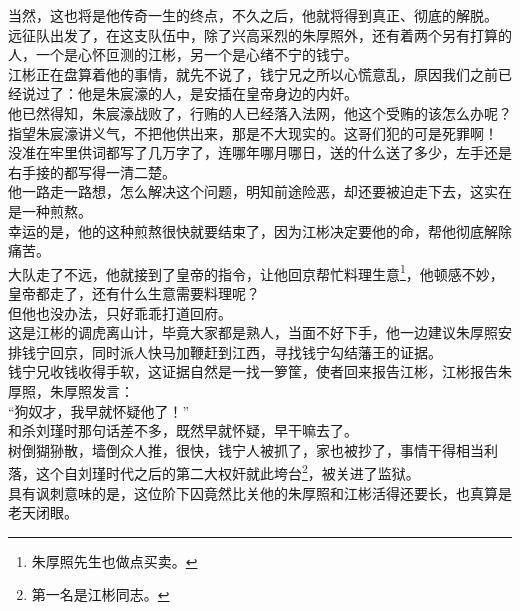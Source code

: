 \begin{multicols}{\theparacolNo}
当然，这也将是他传奇一生的终点，不久之后，他就将得到真正、彻底的解脱。\\

远征队出发了，在这支队伍中，除了兴高采烈的朱厚照外，还有着两个另有打算的人，一个是心怀叵测的江彬，另一个是心绪不宁的钱宁。\\

江彬正在盘算着他的事情，就先不说了，钱宁兄之所以心慌意乱，原因我们之前已经说过了：他是朱宸濠的人，是安插在皇帝身边的内奸。\\

他已然得知，朱宸濠战败了，行贿的人已经落入法网，他这个受贿的该怎么办呢？指望朱宸濠讲义气，不把他供出来，那是不大现实的。这哥们犯的可是死罪啊！\\

没准在牢里供词都写了几万字了，连哪年哪月哪日，送的什么送了多少，左手还是右手接的都写得一清二楚。\\

他一路走一路想，怎么解决这个问题，明知前途险恶，却还要被迫走下去，这实在是一种煎熬。\\

幸运的是，他的这种煎熬很快就要结束了，因为江彬决定要他的命，帮他彻底解除痛苦。\\

大队走了不远，他就接到了皇帝的指令，让他回京帮忙料理生意\footnote{朱厚照先生也做点买卖。}，他顿感不妙，皇帝都走了，还有什么生意需要料理呢？\\

但他也没办法，只好乖乖打道回府。\\

这是江彬的调虎离山计，毕竟大家都是熟人，当面不好下手，他一边建议朱厚照安排钱宁回京，同时派人快马加鞭赶到江西，寻找钱宁勾结藩王的证据。\\

钱宁兄收钱收得手软，这证据自然是一找一箩筐，使者回来报告江彬，江彬报告朱厚照，朱厚照发言：\\

“狗奴才，我早就怀疑他了！”\\

和杀刘瑾时那句话差不多，既然早就怀疑，早干嘛去了。\\

树倒猢狲散，墙倒众人推，很快，钱宁人被抓了，家也被抄了，事情干得相当利落，这个自刘瑾时代之后的第二大权奸就此垮台\footnote{第一名是江彬同志。}，被关进了监狱。\\

具有讽刺意味的是，这位阶下囚竟然比关他的朱厚照和江彬活得还要长，也真算是老天闭眼。\\


\end{multicols}
